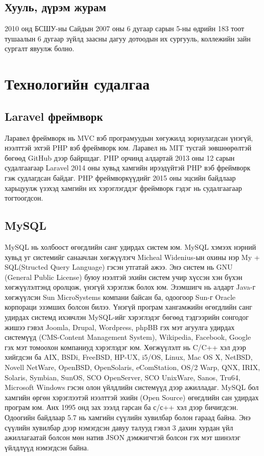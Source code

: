 \documentclass[
oneside, %
english, %
onehalfspacing, %
nolistspacing, %
headsepline, %
]{article} %
\begin{document}
	
	\subsection{Хууль, дүрэм журам}
	2010 онд БСШУ-ны Сайдын 2007 оны 6 дугаар сарын 5-ны өдрийн 183 тоот тушаалын 6 дугаар зүйлд заасны дагуу дотоодын их сургууль, коллежийн зайн сургалт явуулж болно. 
	
	
	\section{Технологийн судалгаа}
	
	\subsection{Laravel фреймворк}
	Ларавел фреймворк нь  MVC вэб програмуудын хөгужилд зориулагдсан үнэгүй, нээлттэй эхтэй PHP вэб фреймворк юм. Ларавел нь MIT тусгай зөвшөөрөлтэй бөгөөд GitHub дээр байршдаг. PHP орчинд алдартай 2013 оны 12 сарын судалгаагаар Laravel  2014 оны хувьд хамгийн ирээдүйтэй PHP вэб фреймворк гэж судлагдсан байдаг.
	PHP фреймворкүүдийг 2015 оны эцсийн байдлаар харьцуулж үзэхэд  хамгийн их хэрэглэгддэг фреймворк гэдэг нь судалгаагаар тогтоогдсон.
	
	\subsection{MySQL}
	MySQL нь холбоост өгөгдлийн санг удирдах систем юм. MySQL хэмээх нэрний хувьд уг системийг санаачлан хөгжүүлэгч Micheal Widenius-ын охины нэр My + SQL(Structed Query Language) гэсэн утгатай ажээ.
	Энэ систем нь GNU (General Public License) буюу нээлтэй эхийн систем учир хүссэн хэн бүхэн хөгжүүлэлтэнд оролцож, үнэгүй хэрэглэж болох юм. Эзэмшигч нь алдарт Java-г хөгжүүлсэн Sun MicroSystems компани байсан ба, одоогоор Sun-г Oracle корпораци эзэмших болсон билээ.
	Үнэгүй програм хангамжийн өгөгдлийн санг удирдах системд ихэвчлэн MySQL-ийг хэрэглэдэг бөгөөд тэдгээрийн сонгодог жишээ гэвэл Joomla, Drupal, Wordpress, phpBB гэх мэт агуулга удирдах системүүд (CMS-Content Management System), Wikipedia, Facebook, Google гэх мэт томоохон компаниуд хэрэглэдэг юм.
	Хөгжүүлэлт нь C/C++ хэл дээр хийгдсэн ба AIX, BSDi, FreeBSD, HP-UX, i5/OS, Linux, Mac OS X, NetBSD, Novell NetWare, OpenBSD, OpenSolaris, eComStation, OS/2 Warp, QNX, IRIX, Solaris, Symbian, SunOS, SCO OpenServer, SCO UnixWare, Sanos, Tru64, Microsoft Windows гэсэн олон үйлдлийн системүүд дээр ажилладаг.
	MySQL бол хамгийн өргөн хэрэглээтэй нээлттэй эхийн (Open Source) өгөгдлийн сан удирдах програм юм. Анх 1995 онд зах зээлд гарсан ба с/с++ хэл дээр бичигдсэн. Одоогийн байдлаар 5.7 нь хамгийн сүүлийн хувилбар болон гараад байна. Энэ сүүлийн хувилбар дээр нэмэгдсэн давуу талууд гэвэл 3 дахин хурдан үйл ажиллагаатай болсон мөн натив JSON дэмжигчтэй болсон гэх мэт шинэлэг үйлдлүүд нэмэгдсэн байна.
	
\end{document}
